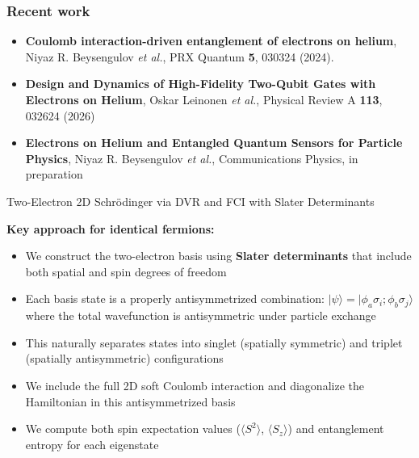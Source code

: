\documentclass[aspectratio=169,10pt]{beamer}
\begin{document}
\begin{frame}
\frametitle{Recent work}

\begin{block}{}
\begin{itemize}
\item {\bf Coulomb interaction-driven entanglement of electrons on helium}, Niyaz R. Beysengulov {\em et al.}, PRX Quantum {\bf 5}, 030324 (2024).
\item {\bf Design and Dynamics of High-Fidelity Two-Qubit Gates with Electrons on Helium}, Oskar Leinonen {\em et al.}, Physical Review A {\bf 113}, 032624 (2026)
\item {\bf Electrons on Helium and Entangled Quantum Sensors for Particle Physics}, Niyaz R. Beysengulov {\em et al.}, Communications Physics, in preparation
\end{itemize}
\end{block}

\end{frame}



\begin{frame}{Two-Electron 2D Schrödinger via DVR and FCI with Slater Determinants}

\textbf{Key approach for identical fermions:}
\begin{itemize}
\item We construct the two-electron basis using \textbf{Slater determinants} that include both spatial and spin degrees of freedom
\item Each basis state is a properly antisymmetrized combination: $|\psi\rangle = |\phi_a \sigma_i; \phi_b \sigma_j\rangle$ where the total wavefunction is antisymmetric under particle exchange
\item This naturally separates states into singlet (spatially symmetric) and triplet (spatially antisymmetric) configurations
\item We include the full 2D soft Coulomb interaction and diagonalize the Hamiltonian in this antisymmetrized basis
\item We compute both spin expectation values ($\langle S^2 \rangle$, $\langle S_z \rangle$) and entanglement entropy for each eigenstate
\end{itemize}

\end{frame}
\end{document}
